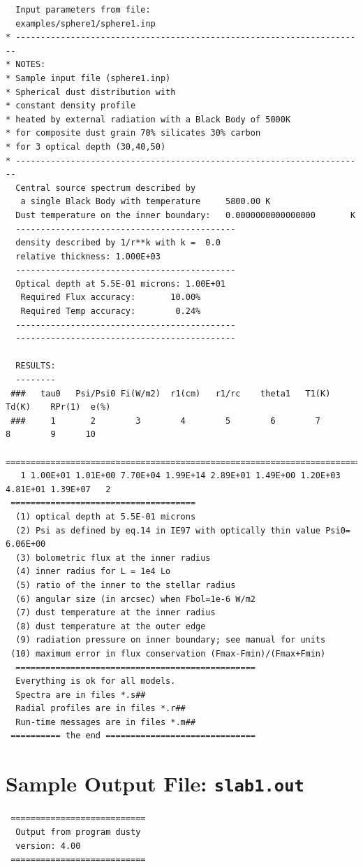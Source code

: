 \documentclass[11pt]{article}
\begin{document}
\begin{appendix}
\begin{verbatim}
  Input parameters from file:
  examples/sphere1/sphere1.inp
* ----------------------------------------------------------------------
* NOTES:
* Sample input file (sphere1.inp)
* Spherical dust distribution with
* constant density profile
* heated by external radiation with a Black Body of 5000K
* for composite dust grain 70% silicates 30% carbon
* for 3 optical depth (30,40,50)
* ----------------------------------------------------------------------
  Central source spectrum described by
   a single Black Body with temperature     5800.00 K
  Dust temperature on the inner boundary:   0.0000000000000000       K
  --------------------------------------------
  density described by 1/r**k with k =  0.0
  relative thickness: 1.000E+03
  --------------------------------------------
  Optical depth at 5.5E-01 microns: 1.00E+01
   Required Flux accuracy:       10.00%
   Required Temp accuracy:        0.24%
  --------------------------------------------
  --------------------------------------------

  RESULTS:
  --------
 ###   tau0   Psi/Psi0 Fi(W/m2)  r1(cm)   r1/rc    theta1   T1(K)    Td(K)    RPr(1)  e(%)
 ###     1       2        3        4        5        6        7        8        9      10
 ========================================================================================
   1 1.00E+01 1.01E+00 7.70E+04 1.99E+14 2.89E+01 1.49E+00 1.20E+03 4.81E+01 1.39E+07   2
 =====================================
  (1) optical depth at 5.5E-01 microns
  (2) Psi as defined by eq.14 in IE97 with optically thin value Psi0= 6.06E+00
  (3) bolometric flux at the inner radius
  (4) inner radius for L = 1e4 Lo
  (5) ratio of the inner to the stellar radius
  (6) angular size (in arcsec) when Fbol=1e-6 W/m2
  (7) dust temperature at the inner radius
  (8) dust temperature at the outer edge
  (9) radiation pressure on inner boundary; see manual for units
 (10) maximum error in flux conservation (Fmax-Fmin)/(Fmax+Fmin)
  ================================================
  Everything is ok for all models.
  Spectra are in files *.s##
  Radial profiles are in files *.r##
  Run-time messages are in files *.m##
 ========== the end ==============================

\end{verbatim}


\section{Sample Output File: \tt slab1.out}
\label{slab1}
\begin{verbatim}
 ===========================
  Output from program dusty
  version: 4.00
 ===========================


\end{verbatim}
\end{appendix}
\end{document}
